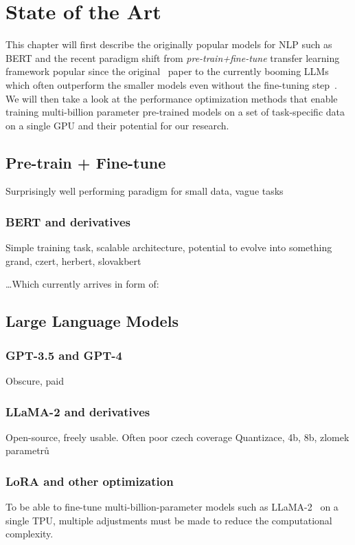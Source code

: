 
\chapter{State of the Art}

This chapter will first describe the originally popular models for NLP such as BERT and the recent paradigm shift from \textit{pre-train+fine-tune} transfer learning framework popular since the original~\cite{devlin2019bert} paper to the currently booming LLMs which often outperform the smaller models even without the fine-tuning step~\cite{gpt4,llama,vicuna}. We will then take a look at the performance optimization methods that enable training multi-billion parameter pre-trained models on a set of task-specific data on a single GPU and their potential for our research. 

\label{chap:sota}
\section{Pre-train + Fine-tune}
\label{sec:pretrain}
Surprisingly well performing paradigm for small data, vague tasks
\subsection{BERT and derivatives}
Simple training task, scalable architecture, potential to evolve into something grand, czert, herbert, slovakbert

\dots Which currently arrives in form of:

\section{Large Language Models}
\label{sec:llms}
\subsection{GPT-3.5 and GPT-4}
\label{sec:gpt}
Obscure, paid~\cite{gpt3,gpt4}

\subsection{LLaMA-2 and derivatives}
\label{sec:llama}
Open-source, freely usable.
Often poor czech coverage 
Quantizace, 4b, 8b, zlomek parametrů\cite{openassistant}

\subsection{LoRA and other optimization}
To be able to fine-tune multi-billion-parameter models such as \textsf{LLaMA-2}~\cite{llama2} on a single TPU, multiple adjustments must be made to reduce the computational complexity.~\cite{peft}
\cite{lora}

